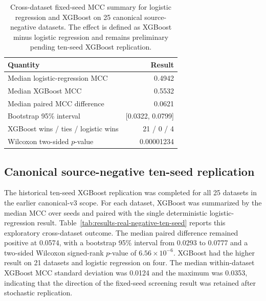 \begin{table}[htbp]
  \centering
  \caption{Cross-dataset fixed-seed MCC summary for logistic regression and XGBoost on 25 canonical source-negative datasets. The effect is defined as XGBoost minus logistic regression and remains preliminary pending ten-seed XGBoost replication.}
  \label{tab:results-real-negative-fixed-seed}
  \begin{tabular}{lr}
    \toprule
    Quantity & Result \\
    \midrule
    Median logistic-regression MCC & 0.4942 \\
    Median XGBoost MCC & 0.5532 \\
    Median paired MCC difference & 0.0621 \\
    Bootstrap 95\% interval & [0.0322, 0.0799] \\
    XGBoost wins / ties / logistic wins & 21 / 0 / 4 \\
    Wilcoxon two-sided $p$-value & 0.00001234 \\
    \bottomrule
  \end{tabular}
\end{table}

\subsection{Canonical source-negative ten-seed replication}

The historical ten-seed XGBoost replication was completed for all 25 datasets
in the earlier canonical-v3 scope. For each dataset, XGBoost was summarized by the median
MCC over seeds and paired with the single deterministic logistic-regression
result. Table~\ref{tab:results-real-negative-ten-seed} reports this exploratory
cross-dataset outcome. The median paired difference remained positive at 0.0574,
with a bootstrap 95\% interval from 0.0293 to 0.0777 and a two-sided Wilcoxon
signed-rank $p$-value of $6.56\times10^{-6}$. XGBoost had the higher result on
21 datasets and logistic regression on four. The median within-dataset XGBoost
MCC standard deviation was 0.0124 and the maximum was 0.0353, indicating that
the direction of the fixed-seed screening result was retained after stochastic
replication.

